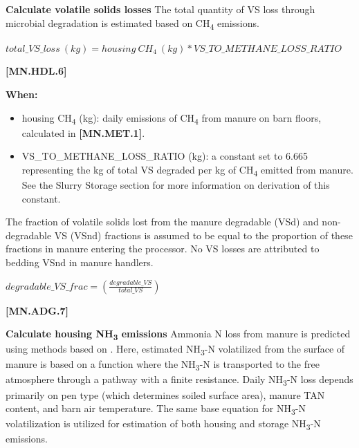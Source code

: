 \begin{refsection}
\textbf{Calculate volatile solids losses}
The total quantity of VS loss through microbial degradation is estimated based on CH\textsubscript{4} emissions.
 \vspace{0.2cm}

    \begin{center}
        \(total\_VS\_loss\ (kg) = housing\ CH_4\ (kg)  * VS\_TO\_METHANE\_LOSS\_RATIO\)
    \end{center}
        \vspace{0.5cm} 
    
            {\raggedleft \textbf{[MN.HDL.6]}\par}
            \vspace{0.5cm}

\textbf{When:}
    \begin{itemize}
        \item housing CH\textsubscript{4} (kg): daily emissions of CH\textsubscript{4} from manure on barn floors, calculated in \textbf{[MN.MET.1]}.
        \item VS\_TO\_METHANE\_LOSS\_RATIO (kg): a constant set to 6.665 representing the kg of total VS degraded per kg of CH\textsubscript{4} emitted from manure. See the Slurry Storage section for more information on derivation of this constant.
    \end{itemize}  


The fraction of volatile solids lost from the manure degradable (VSd) and non-degradable VS (VSnd) fractions is assumed to be equal to the proportion of these fractions in manure entering the processor. No VS losses are attributed to bedding VSnd in manure handlers.
 \vspace{0.2cm}

    \begin{center}
\(degradable\_VS\_frac = (\frac{degradable\_VS}{total\_VS}) \)
    \end{center}
        \vspace{0.5cm} 
    
            {\raggedleft \textbf{[MN.ADG.7]}\par}
            \vspace{0.5cm}

\textbf{Calculate housing NH\textsubscript{3} emissions}
Ammonia N loss from manure is predicted using methods based on \cite{Rotz2006}. Here, estimated NH\textsubscript{3}-N volatilized from the surface of manure is based on a function where the NH\textsubscript{3}-N is transported to the free atmosphere through a pathway with a finite resistance. Daily NH\textsubscript{3}-N loss depends primarily on pen type (which determines soiled surface area), manure TAN content, and barn air temperature. The same base equation for NH\textsubscript{3}-N volatilization is utilized for estimation of both housing and storage NH\textsubscript{3}-N emissions. 
\vspace{0.2cm}


\end{refsection}
